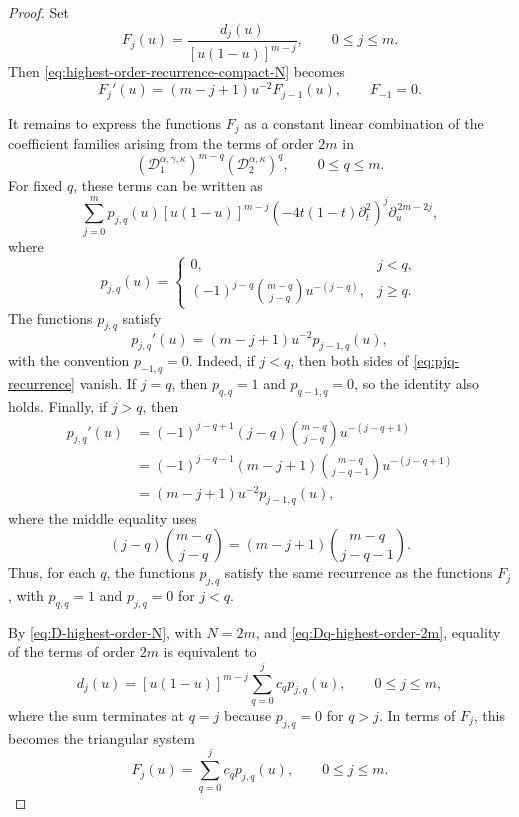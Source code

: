 \documentclass[reqno,10pt]{amsart}
\theoremstyle{plain}
\numberwithin{equation}{section}
\numberwithin{figure}{section}
\begin{document}
\begin{proof}
Set
\[
F_j(u)
=
\frac{d_j(u)}{[u(1-u)]^{m-j}},
\qquad 0\leq j\leq m.
\]
Then \eqref{eq:highest-order-recurrence-compact-N} becomes
\begin{equation}\label{eq:Fj_recurrence}
F_j'(u)
=
(m-j+1)u^{-2}F_{j-1}(u),
\qquad F_{-1}=0.
\end{equation}

It remains to express the functions \(F_j\) as a constant linear
combination of the coefficient families arising from the terms of order
\(2m\) in
\[
\left(\mathcal D_1^{\alpha,\gamma,\kappa}\right)^{m-q}
\left(\mathcal D_2^{\alpha,\kappa}\right)^q,
\qquad 0\leq q\leq m.
\]
For fixed \(q\), these terms can be written as
\begin{equation}\label{eq:Dq-highest-order-2m}
\sum_{j=0}^{m}
p_{j,q}(u)
[u(1-u)]^{m-j}
\left(-4t(1-t)\partial_t^2\right)^j
\partial_u^{\,2m-2j},
\end{equation}
where
\[
p_{j,q}(u)
=
\begin{cases}
0, & j<q,\\[4pt]
(-1)^{j-q}
\binom{m-q}{j-q}
u^{-(j-q)}, & j\ge q.
\end{cases}
\]
The functions \(p_{j,q}\) satisfy
\begin{equation}\label{eq:pjq-recurrence}
p_{j,q}'(u)
=
(m-j+1)u^{-2}p_{j-1,q}(u),
\end{equation}
with the convention \(p_{-1,q}=0\). Indeed, if \(j<q\), then both sides
of \eqref{eq:pjq-recurrence} vanish. If \(j=q\), then \(p_{q,q}=1\) and
\(p_{q-1,q}=0\), so the identity also holds. Finally, if \(j>q\), then
\[
\begin{aligned}
p_{j,q}'(u)
&=
(-1)^{j-q+1}(j-q)
\binom{m-q}{j-q}
u^{-(j-q+1)}
\\
&=
(-1)^{j-q-1}(m-j+1)
\binom{m-q}{j-q-1}
u^{-(j-q+1)}
\\
&=
(m-j+1)u^{-2}p_{j-1,q}(u),
\end{aligned}
\]
where the middle equality uses
\[
(j-q)\binom{m-q}{j-q}
=
(m-j+1)\binom{m-q}{j-q-1}.
\]
Thus, for each \(q\), the functions \(p_{j,q}\) satisfy the same
recurrence as the functions \(F_j\), with \(p_{q,q}=1\) and
\(p_{j,q}=0\) for \(j<q\).

By \eqref{eq:D-highest-order-N}, with \(N=2m\), and
\eqref{eq:Dq-highest-order-2m}, equality of the terms of order \(2m\) is
equivalent to
\[
d_j(u)
=
[u(1-u)]^{m-j}
\sum_{q=0}^{j}c_qp_{j,q}(u),
\qquad 0\le j\le m,
\]
where the sum terminates at \(q=j\) because \(p_{j,q}=0\) for \(q>j\).
In terms of \(F_j\), this becomes the triangular system
\[
F_j(u)
=
\sum_{q=0}^{j}c_qp_{j,q}(u),
\qquad 0\le j\le m.
\]


\end{proof}
\end{document}
